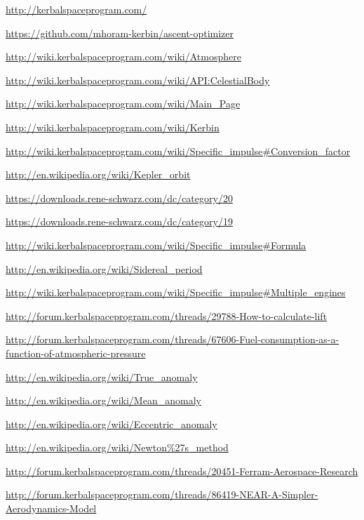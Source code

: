 \documentclass[11pt]{report}
\begin{document}
\begin{thebibliography}{Kerbin}

  \url{http://kerbalspaceprogram.com/}

  \url{https://github.com/mhoram-kerbin/ascent-optimizer}

  \url{http://wiki.kerbalspaceprogram.com/wiki/Atmosphere}

  \url{http://wiki.kerbalspaceprogram.com/wiki/API:CelestialBody}

  \url{http://wiki.kerbalspaceprogram.com/wiki/Main_Page}

  \url{http://wiki.kerbalspaceprogram.com/wiki/Kerbin}

  \url{http://wiki.kerbalspaceprogram.com/wiki/Specific_impulse#Conversion_factor}

  \url{http://en.wikipedia.org/wiki/Kepler_orbit}

  \url{https://downloads.rene-schwarz.com/dc/category/20}

  \url{https://downloads.rene-schwarz.com/dc/category/19}

  \url{http://wiki.kerbalspaceprogram.com/wiki/Specific_impulse#Formula}

  \url{http://en.wikipedia.org/wiki/Sidereal_period}

  \url{http://wiki.kerbalspaceprogram.com/wiki/Specific_impulse#Multiple_engines}

  \url{http://forum.kerbalspaceprogram.com/threads/29788-How-to-calculate-lift}

  \url{http://forum.kerbalspaceprogram.com/threads/67606-Fuel-consumption-as-a-function-of-atmospheric-pressure}

  \url{http://en.wikipedia.org/wiki/True_anomaly}

  \url{http://en.wikipedia.org/wiki/Mean_anomaly}

  \url{http://en.wikipedia.org/wiki/Eccentric_anomaly}

  \url{http://en.wikipedia.org/wiki/Newton\%27s_method}

  \url{http://forum.kerbalspaceprogram.com/threads/20451-Ferram-Aerospace-Research}

  \url{http://forum.kerbalspaceprogram.com/threads/86419-NEAR-A-Simpler-Aerodynamics-Model}


\end{thebibliography}
\end{document}
